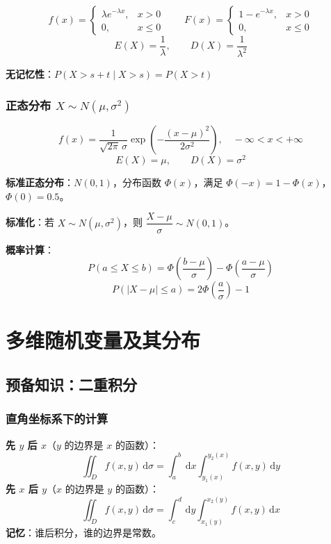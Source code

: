 \documentclass[12pt, a4paper]{article}
\newcommand{\dif}{\,\mathrm{d}}
\begin{document}
\[
    f(x)=\begin{cases}\lambda e^{-\lambda x}, & x>0\\0, & x\le 0\end{cases}
    \qquad
    F(x)=\begin{cases}1-e^{-\lambda x}, & x>0\\0, & x\le 0\end{cases}
\]
\[
    E(X)=\frac{1}{\lambda}, \qquad D(X)=\frac{1}{\lambda^2}
\]

\textbf{无记忆性}：$P(X>s+t\mid X>s)=P(X>t)$

\subsubsection{正态分布 $X\sim N(\mu,\sigma^2)$}

\[
    f(x)=\frac{1}{\sqrt{2\pi}\,\sigma}
    \exp\!\left(-\frac{(x-\mu)^2}{2\sigma^2}\right), \quad -\infty<x<+\infty
\]
\[
    E(X)=\mu, \qquad D(X)=\sigma^2
\]

\begin{tcolorbox}[thmbox, title={正态分布概率计算}]
    \textbf{标准正态分布}：$N(0,1)$，分布函数 $\Phi(x)$，满足 $\Phi(-x)=1-\Phi(x)$，$\Phi(0)=0.5$。

    \textbf{标准化}：若 $X\sim N(\mu,\sigma^2)$，则 $\dfrac{X-\mu}{\sigma}\sim N(0,1)$。

    \textbf{概率计算}：
    \[
        P(a\le X\le b) = \Phi\!\left(\frac{b-\mu}{\sigma}\right)
        - \Phi\!\left(\frac{a-\mu}{\sigma}\right)
    \]
    \[
        P(|X-\mu|\le a) = 2\Phi\!\left(\frac{a}{\sigma}\right)-1
    \]
\end{tcolorbox}

\section{多维随机变量及其分布}

\subsection{预备知识：二重积分}

\subsubsection{直角坐标系下的计算}

\begin{tcolorbox}[thmbox, title={二重积分的计算}]
    \textbf{先 $y$ 后 $x$}（$y$ 的边界是 $x$ 的函数）：
    \[
        \iint_D f(x,y)\dif\sigma
        = \int_a^b\dif x \int_{y_1(x)}^{y_2(x)} f(x,y)\dif y
    \]
    \textbf{先 $x$ 后 $y$}（$x$ 的边界是 $y$ 的函数）：
    \[
        \iint_D f(x,y)\dif\sigma
        = \int_c^d\dif y \int_{x_1(y)}^{x_2(y)} f(x,y)\dif x
    \]
    \textbf{记忆}：谁后积分，谁的边界是常数。
\end{tcolorbox}
\end{document}
